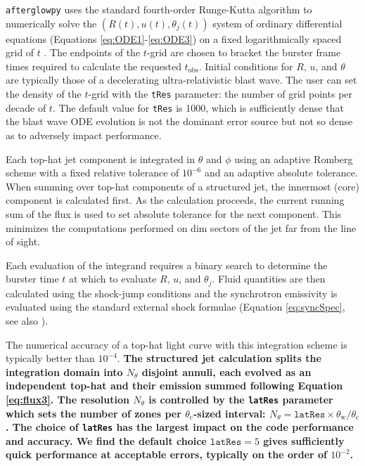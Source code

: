 \documentclass[twocolumn]{aastex62}
\newcommand{\afterglowpy}{{\tt afterglowpy}}
\newcommand{\tobs}{\ensuremath{t_{\mathrm{obs}}}}
\newcommand{\thW}{\ensuremath{\theta_{\mathrm{w}}}}
\newcommand{\thC}{\ensuremath{\theta_{\mathrm{c}}}}
\begin{document}
\afterglowpy{} uses the standard fourth-order Runge-Kutta algorithm to numerically solve the $(R(t), u(t), \theta_j(t))$ system of ordinary differential equations (Equations \eqref{eq:ODE1}-\eqref{eq:ODE3}) on a fixed logarithmically spaced grid of $t$ \citep{Press:2007aa}.  The endpoints of the $t$-grid are chosen to bracket the burster frame times required to calculate the requested $\tobs$.  Initial conditions for $R$, $u$, and $\theta$ are typically those of a decelerating ultra-relativistic blast wave.  The user can set the density of the $t$-grid with the {\tt tRes} parameter: the number of grid points per decade of $t$.  The default value for {\tt tRes} is 1000, which is sufficiently dense that the blast wave ODE evolution is not the dominant error source but not so dense as to adversely impact performance.

Each top-hat jet component is integrated in $\theta$ and $\phi$ using an adaptive Romberg scheme with a fixed relative tolerance of $10^{-6}$ and an adaptive absolute tolerance.  When summing over top-hat components of a structured jet, the innermost (core) component is calculated first.  As the calculation proceeds, the current running sum of the flux is used to set absolute tolerance for the next component.  This minimizes the computations performed on dim sectors of the jet far from the line of sight.

Each evaluation of the integrand requires a binary search to determine the burster time $t$ at which to evaluate $R$, $u$, and $\theta_j$.  Fluid quantities are then calculated using the shock-jump conditions and the synchrotron emissivity is evaluated using the standard external shock formulae (Equation \eqref{eq:syncSpec}, see also \citet{Granot:2002aa,van-Eerten:2010aa}).  

The numerical accuracy of a top-hat light curve with this integration scheme is typically better than $10^{-4}$. {\bf The structured jet calculation splits the integration domain into $N_\theta$ disjoint annuli, each evolved as an independent top-hat and their emission summed following Equation \eqref{eq:flux3}.  The resolution $N_\theta$ is controlled by the {\tt latRes} parameter which sets the number of zones per $\thC$-sized interval: $N_\theta = \mathtt{latRes} \times \thW/\thC$. The choice of  {\tt latRes} has the largest impact on the code performance and accuracy.  We find the default choice $\mathtt{latRes} = 5$ gives sufficiently quick performance at acceptable errors, typically on the order of $10^{-2}$. }
\end{document}
